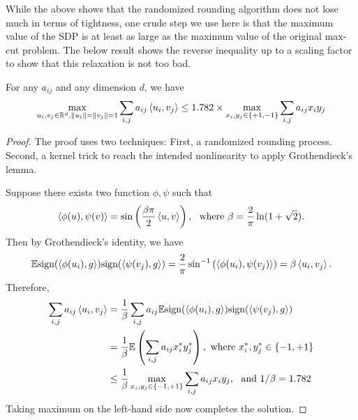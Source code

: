 \documentclass[12pt]{article}
\begin{document}
While the above shows that the randomized rounding algorithm does not lose much in terms of tightness, one crude step we use here is that the maximum value of the SDP is at least as large as the maximum value of the original max-cut problem. The below result shows the reverse inequality up to a scaling factor to show that this relaxation is not too bad.

\begin{theorembox}
    For any $a_{ij}$ and any dimension $d$, we have
    \begin{equation*}
        \max_{u_i, v_j \in \mathbb{R}^d, \left\Vert u_i \right\Vert = \left\Vert v_j \right\Vert = 1} \sum_{i,j}a_{ij}\left\langle u_i, v_j \right\rangle \leq 1.782 \times \max_{x_i, y_j \in \{+1, -1\} }\sum_{i,j} a_{ij}x_i y_j
    \end{equation*}
\end{theorembox}
\begin{proof}
    The proof uses two techniques: First, a randomized rounding process. Second, a kernel trick to reach the intended nonlinearity to apply Grothendieck's lemma.

    Suppose there exists two function $\phi, \psi$ such that 
    \begin{equation*}
        \left\langle \phi(u), \psi(v) \right\rangle = \sin\left( \dfrac{\beta \pi}{2}\left\langle u,v \right\rangle \right), \ \text{ where } \beta = \dfrac{2}{\pi}\ln(1+\sqrt{2}).
    \end{equation*}
    \noindent Then by Grothendieck's identity, we have
    \begin{equation*}
        \mathbb{E}\text{sign}(\left\langle \phi(u_i), g \right\rangle)\text{sign}(\left\langle \psi(v_j), g \right\rangle) = \dfrac{2}{\pi}\sin^{-1}\left( \left\langle \phi(u_i), \psi(v_j) \right\rangle \right) = \beta\left\langle u_i, v_j \right\rangle.
    \end{equation*}
    \noindent Therefore,
    \begin{align*}
        \sum_{i,j}a_{ij}\left\langle u_i, v_j \right\rangle
        & = \dfrac{1}{\beta} \sum_{i,j} a_{ij} \mathbb{E}\text{sign}(\left\langle \phi(u_i), g \right\rangle)\text{sign}(\left\langle \psi(v_j), g \right\rangle)\\
        & = \dfrac{1}{\beta} \mathbb{E}\left( \sum_{i,j} a_{ij}x_i^\ast y_j^\ast \right), \text{ where } x_i^\ast, y_j^\ast \in \{ -1, +1 \}\\
        & \leq \dfrac{1}{\beta} \max_{x_i, y_j \in \{-1, +1\} } \sum_{i,j} a_{ij}x_i y_j, \ \text{ and } 1/\beta = 1.782
    \end{align*}
    \noindent Taking maximum on the left-hand side now completes the solution.
\end{proof}
\end{document}
